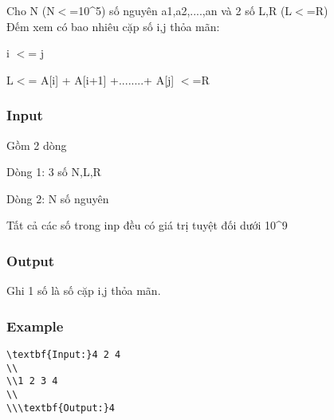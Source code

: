 



    Cho N (N$<$=10\textasciicircum5) số nguyên a1,a2,....,an và 2 số L,R (L$<$=R)    
\\



    Đếm xem có bao nhiêu cặp số i,j thỏa mãn:   



    i $<$= j   



    L$<$= A[i] + A[i+1] +........+ A[j] $<$=R   

\subsubsection{   Input  }

    Gồm 2 dòng   

    Dòng 1: 3 số N,L,R   

    Dòng 2: N số nguyên   

    Tất cả các số trong inp đều có giá trị tuyệt đối dưới 10\textasciicircum9    
\\

\subsubsection{   Output  }

    Ghi 1 số là số cặp i,j thỏa mãn.   

\subsubsection{   Example  }
\begin{verbatim}
\textbf{Input:}4 2 4
\\
\\1 2 3 4
\\
\\\textbf{Output:}4\end{verbatim}